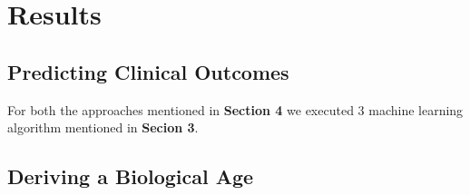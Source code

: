 \section{Results}

\subsection{Predicting Clinical Outcomes}
For both the approaches mentioned in \textbf{Section 4} we executed 3 machine learning algorithm mentioned in \textbf{Secion 3}.


% 
% 
% 

\subsection{Deriving a Biological Age}

